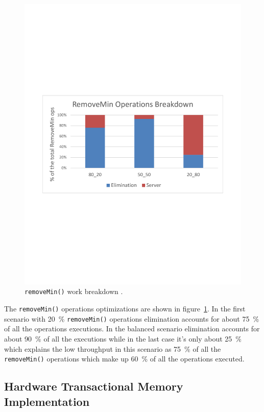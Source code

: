 \begin{figure}[htb]
\begin{minipage}[b]{.495\textwidth}
		\includegraphics[width=\linewidth]{graphics/sparc-rem-brk.pdf}
		\caption{\texttt{removeMin()} work breakdown \cite{calciu_adaptive_2014}.}
		\label{fig:sparc_rem}
	\end{minipage}
\end{figure}

The \texttt{removeMin()} operations optimizations are shown in figure~\ref{fig:sparc_rem}. In the first scenario with 20~\% \texttt{removeMin()} operations elimination accounts for about 75~\% of all the operations executions. In the balanced scenario elimination accounts for about 90~\% of all the executions while in the last case it's only about 25~\% which explains the low throughput in this scenario as 75~\% of all the \texttt{removeMin()} operations which make up 60~\% of all the operations executed.

\subsection{Hardware Transactional Memory Implementation}

